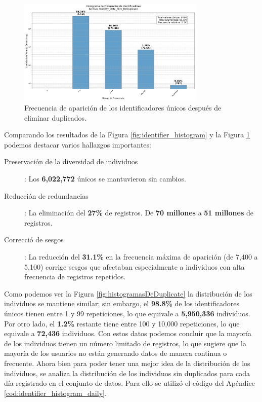 \begin{figure}[H]
    \centering
    \includegraphics[width=0.8\textwidth]{img/histograma_identifier_Mobility_Data_Slim_DeDuplicate.png}
    \caption{Frecuencia de aparición de los identificadores únicos después de eliminar duplicados.}
    \label{fig:identifier_histogram_deduplicate}
\end{figure}

Comparando los resultados de la Figura \ref{fig:identifier_histogram} y la Figura \ref{fig:identifier_histogram_deduplicate} podemos destacar varios hallazgos importantes: 

\begin{description}
    \item[Preservación de la diversidad de individuos]: Los \textbf{6,022,772} únicos se mantuvieron sin cambios.
    \item[Reducción de redundancias]: La eliminación del \textbf{27\%} de registros. De \textbf{70 millones} a \textbf{51 millones} de registros.
    \item[Correcció de sesgos]: La reducción del \textbf{31.1\%} en la frecuencia máxima de aparición (de 7,400 a 5,100) corrige sesgos que afectaban especialmente a individuos con alta frecuencia de registros repetidos. 
\end{description}

Como podemos ver la Figura \ref{fig:histogramasDeDuplicate} la distribución de los individuos se mantiene similar; sin embargo, el \textbf{98.8\%} de los identificadores únicos tienen entre 1 y 99 repeticiones, lo que equivale a \textbf{5,950,336} individuos. Por otro lado, el \textbf{1.2\%} restante tiene entre 100 y 10,000 repeticiones, lo que equivale a \textbf{72,436} individuos. Con estos datos podemos concluir que la mayoría de los individuos tienen un número limitado de registros, lo que sugiere que la mayoría de los usuarios no están generando datos de manera continua o frecuente. 
Ahora bien para poder tener una mejor idea de la distribución de los individuos, se analiza la distribución de los individuos sin duplicados para cada día registrado en el conjunto de datos. Para ello se utilizó el código del Apéndice \ref{cod:identifier_histogram_daily}.

